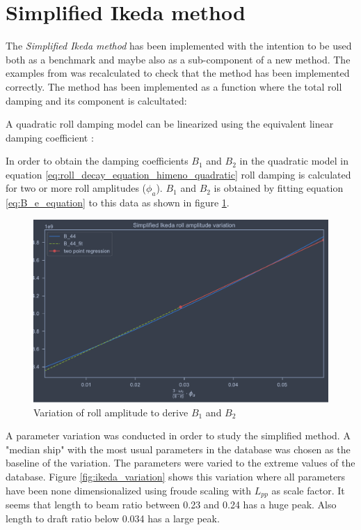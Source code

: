 \section{Simplified Ikeda method}
\label{se:simplified_ikeda}
The \emph{Simplified Ikeda method} \cite{kawahara_simple_2011} has been implemented with the intention to be used both as a benchmark and maybe also as a sub-component of a new method. The examples from \cite{kawahara_simple_2011} was recalculated to check that the method has been implemented correctly.
The method has been implemented as a function where the total roll damping and its component is calcultated: 


A quadratic roll damping model can be linearized using the equivalent linear damping coefficient \cite{himeno_prediction_1981}:

In order to obtain the damping coefficients $B_1$ and $B_2$ in the quadratic model in equation \ref{eq:roll_decay_equation_himeno_quadratic} roll damping is calculated for two or more roll amplitudes ($\phi_a$). $B_1$ and $B_2$ is obtained by fitting equation \ref{eq:B_e_equation} to this data as shown in figure \ref{fig:ikeda_B_1_B2}.  

\begin{figure}[H]
    \centering
    \includegraphics[width=\columnwidth]{figures/ikeda_B_1_B_2.pdf}
    \caption{Variation of roll amplitude to derive $B_1$ and $B_2$}
    \label{fig:ikeda_B_1_B2}
\end{figure}

A parameter variation was conducted in order to study the simplified method.
A "median ship" with the most usual parameters in the database was chosen as the baseline of the variation. The parameters were varied to the extreme values of the database. Figure \ref{fig:ikeda_variation} shows this variation where all parameters have been none dimensionalized using froude scaling with $L_{pp}$ as scale factor. 
It seems that length to beam ratio between 0.23 and 0.24 has a huge peak. Also length to draft ratio below 0.034 has a large peak. 


